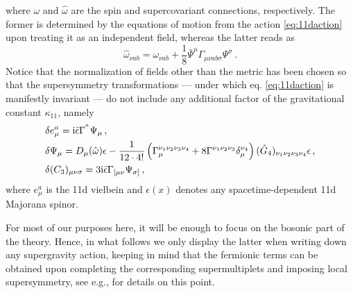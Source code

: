 %
where $\omega$ and $\hat \omega$ are the spin and supercovariant connections, respectively. The former is determined by the equations of motion from the action \eqref{eq:11daction} upon treating it as an independent field, whereas the latter reads as
%
\begin{equation}\label{eq:supercovariantconnection}
       \hat\omega_{\nu a b} = \omega_{\nu a b} + \frac{1}{8} \bar\Psi^{\mu} \Gamma_{\mu \nu a b \sigma} \Psi^{\sigma}\, .
\end{equation}
%
Notice that the normalization of fields other than the metric has been chosen so that the supersymmetry transformations --- under which eq. \eqref{eq:11daction} is manifestly invariant --- do not include any additional factor of the gravitational constant $\kappa_{11}$, namely
%
\begin{equation}\label{eq:11dsusyvariations}
    \begin{aligned}
       &\delta e^{a}_{\mu} = \text{i} \bar \epsilon \Gamma^{^a}\Psi_{\mu}\, ,\\
       &\delta \Psi_{\mu} = D_{\mu} (\hat \omega) \epsilon - \frac{1}{12 \cdot 4!} \left( \Gamma^{\nu_1 \nu_2 \nu_3 \nu_4}_{\mu} + 8 \Gamma^{\nu_1 \nu_2 \nu_3} \delta ^{\nu_4}_{\mu}\right) (\hat{G}_4)_{\nu_1 \nu_2 \nu_3 \nu_4} \epsilon \, ,\\
       &\delta (C_3)_{\mu \nu \sigma} = 3 \text{i} \bar \epsilon \Gamma_{[\mu \nu}\Psi_{\sigma]}\, ,
    \end{aligned}
\end{equation}
%
where $e^{a}_{\mu}$ is the 11d vielbein and $\epsilon(x)$ denotes any spacetime-dependent 11d Majorana spinor.

For most of our purposes here, it will be enough to focus on the bosonic part of the theory. Hence, in what follows we only display the latter when writing down any supergravity action, keeping in mind that the fermionic terms can be obtained upon completing the corresponding supermultiplets and imposing local supersymmetry, see e.g., \cite{Cecotti:2015wqa} for details on this point.

